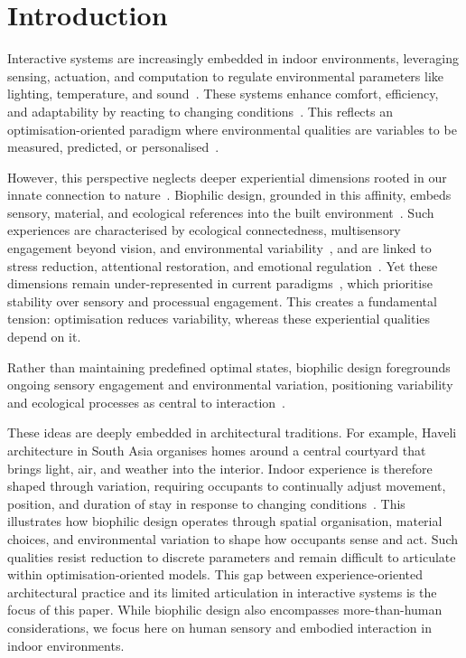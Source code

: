 \section{Introduction}
\label{sec:ch5-introduction}
Interactive systems are increasingly embedded in indoor environments, leveraging sensing, actuation, and computation to regulate environmental parameters like lighting, temperature, and sound~\cite{alavi2019introduction, alavi2017comfort}. These systems enhance comfort, efficiency, and adaptability by reacting to changing conditions~\cite{nguyen2022towards, nguyen2024adaptive, deng2019diffusive}. This reflects an optimisation-oriented paradigm where environmental qualities are variables to be measured, predicted, or personalised~\cite{heidegger2006building}.

However, this perspective neglects deeper experiential dimensions rooted in our innate connection to nature~\cite{wilson1986biophilia, kellert1995biophilia, kellert2018nature}. Biophilic design, grounded in this affinity, embeds sensory, material, and ecological references into the built environment~\cite{wilson1986biophilia, kellert1995biophilia}. Such experiences are characterised by ecological connectedness, multisensory engagement beyond vision, and environmental variability~\cite{rao2025designing}, and are linked to stress reduction, attentional restoration, and emotional regulation~\cite{frumkin2017nature, hartig2014nature, lefosse2023biophilia}. Yet these dimensions remain under-represented in current paradigms~\cite{rao2026emotion}, which prioritise stability over sensory and processual engagement. This creates a fundamental tension: optimisation reduces variability, whereas these experiential qualities depend on it.

Rather than maintaining predefined optimal states, biophilic design foregrounds ongoing sensory engagement and environmental variation, positioning variability and ecological processes as central to interaction~\cite{rao2025designing, rao2025lessons}.

These ideas are deeply embedded in architectural traditions. For example, Haveli architecture in South Asia organises homes around a central courtyard that brings light, air, and weather into the interior. Indoor experience is therefore shaped through variation, requiring occupants to continually adjust movement, position, and duration of stay in response to changing conditions~\cite{verma2022appraisal}. This illustrates how biophilic design operates through spatial organisation, material choices, and environmental variation to shape how occupants sense and act. Such qualities resist reduction to discrete parameters and remain difficult to articulate within optimisation-oriented models. This gap between experience-oriented architectural practice and its limited articulation in interactive systems is the focus of this paper. While biophilic design also encompasses more-than-human considerations, we focus here on human sensory and embodied interaction in indoor environments.

